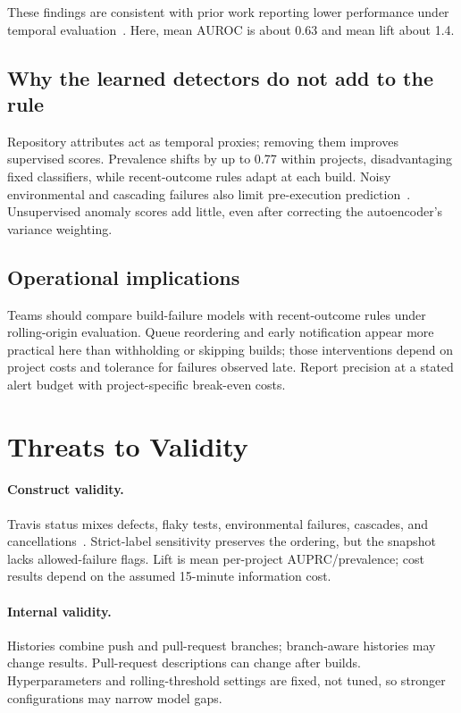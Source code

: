 \documentclass[sigconf,review,anonymous,nonacm]{acmart}
\begin{document}
These findings are consistent with prior work reporting lower performance under temporal evaluation~\cite{chen2020buildfast, lyu2021splitting}. Here, mean AUROC is about 0.63 and mean lift about 1.4.

\subsection{Why the learned detectors do not add to the rule}
\label{sec:discussion-why}

Repository attributes act as temporal proxies; removing them improves supervised scores. Prevalence shifts by up to 0.77 within projects, disadvantaging fixed classifiers, while recent-outcome rules adapt at each build. Noisy environmental and cascading failures also limit pre-execution prediction~\cite{gallaba2018, ghaleb2021noise}. Unsupervised anomaly scores add little, even after correcting the autoencoder's variance weighting.

\subsection{Operational implications}
\label{sec:discussion-practice}

Teams should compare build-failure models with recent-outcome rules under rolling-origin evaluation. Queue reordering and early notification appear more practical here than withholding or skipping builds; those interventions depend on project costs and tolerance for failures observed late. Report precision at a stated alert budget with project-specific break-even costs.

\section{Threats to Validity}
\label{sec:threats}

\paragraph{Construct validity.} Travis status mixes defects, flaky tests, environmental failures, cascades, and cancellations~\cite{gallaba2018, ghaleb2021noise, lampel2021}. Strict-label sensitivity preserves the ordering, but the snapshot lacks allowed-failure flags. Lift is mean per-project AUPRC/prevalence; cost results depend on the assumed 15-minute information cost.

\paragraph{Internal validity.} Histories combine push and pull-request branches; branch-aware histories may change results. Pull-request descriptions can change after builds. Hyperparameters and rolling-threshold settings are fixed, not tuned, so stronger configurations may narrow model gaps.
\end{document}
